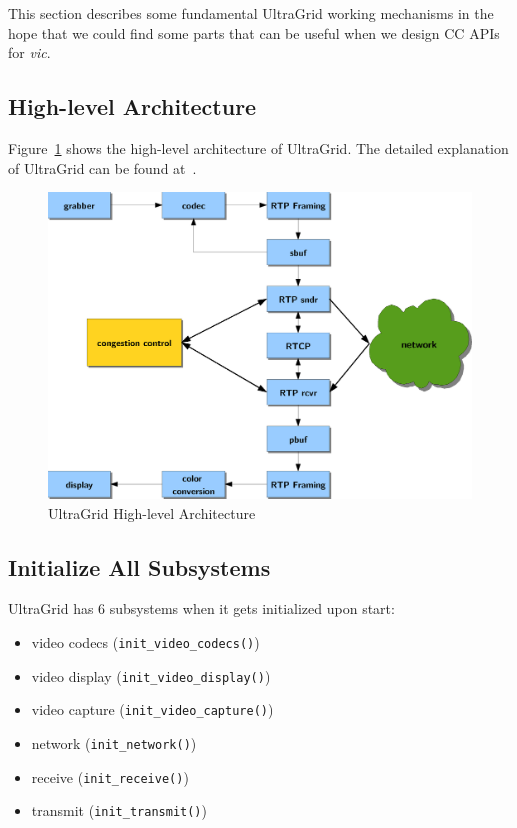 
This section describes some fundamental UltraGrid working mechanisms in the hope
that we could find some parts that can be useful when we design CC APIs for
\emph{vic}.

\subsection{\label{ssec:ultra-intro}High-level Architecture}

Figure~\ref{fig:ultra-high-arch} shows the high-level architecture of UltraGrid.
The detailed explanation of UltraGrid can be found at~\cite{AS06}.

\begin{figure}[!h]
\begin{center}
\includegraphics[scale=.5]{./img/ultra-high-arch}
\caption{\label{fig:ultra-high-arch}UltraGrid High-level Architecture}
\end{center}
\end{figure}

\subsection{\label{ssec:ultra-init-all}Initialize All Subsystems}

UltraGrid has 6 subsystems when it gets initialized upon start: 

\begin{itemize}
	\item video codecs (\texttt{init\_video\_codecs()})
	\item video display (\texttt{init\_video\_display()})
	\item video capture (\texttt{init\_video\_capture()})
	\item network (\texttt{init\_network()})
	\item receive (\texttt{init\_receive()})
	\item transmit (\texttt{init\_transmit()})
\end{itemize}

